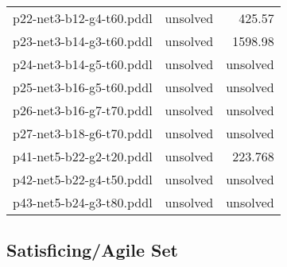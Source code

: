 \documentclass{article}
\begin{document}
\begin{center}
\begin{tabular}{r|r|r}
 p22-net3-b12-g4-t60.pddl&unsolved&425.57\\
 p23-net3-b14-g3-t60.pddl&unsolved&1598.98\\
 p24-net3-b14-g5-t60.pddl&unsolved&unsolved\\
 p25-net3-b16-g5-t60.pddl&unsolved&unsolved\\
 p26-net3-b16-g7-t70.pddl&unsolved&unsolved\\
 p27-net3-b18-g6-t70.pddl&unsolved&unsolved\\
 p41-net5-b22-g2-t20.pddl&unsolved&223.768\\
 p42-net5-b22-g4-t50.pddl&unsolved&unsolved\\
 p43-net5-b24-g3-t80.pddl&unsolved&unsolved
                            \end{tabular}
                            \end{center}
                    
                    
                    \subsection*{Satisficing/Agile Set}
                    
\end{document}
